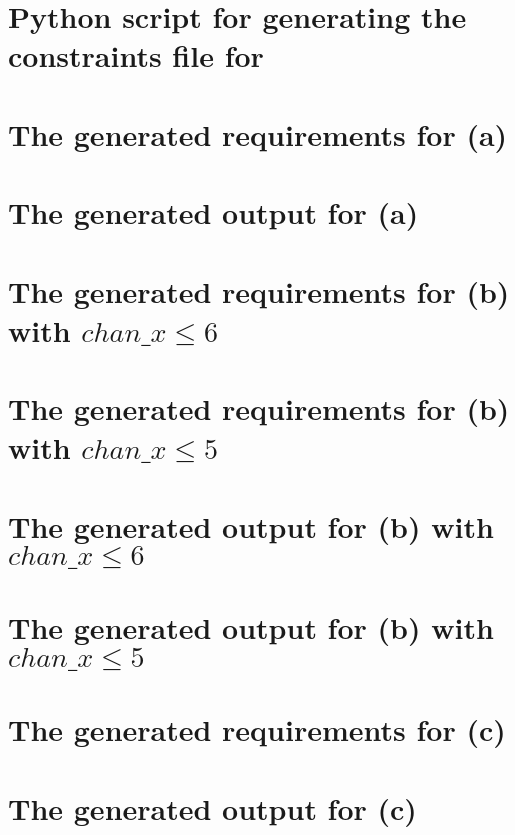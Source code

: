 \begin{appendices}
\chapter{Python script for generating the constraints file for }
\label{app:4_gen.py}


\chapter{The generated requirements for (a)}
\label{app:4_a_in}


\chapter{The generated output for (a)}
\label{app:4_a_out}


\chapter{The generated requirements for (b) with \texorpdfstring{$chan\_x \leq 6$}{leq6}}
\label{app:4_b1_in}


\chapter{The generated requirements for (b) with \texorpdfstring{$chan\_x \leq 5$}{leq5}}
\label{app:4_b2_in}


\chapter{The generated output for (b) with \texorpdfstring{$chan\_x \leq 6$}{leq6}}
\label{app:4_b1_out}


\chapter{The generated output for (b) with \texorpdfstring{$chan\_x \leq 5$}{leq5}}
\label{app:4_b2_out}


\chapter{The generated requirements for (c)}
\label{app:4_c_in}


\chapter{The generated output for (c)}
\label{app:4_c_out}

\end{appendices}
